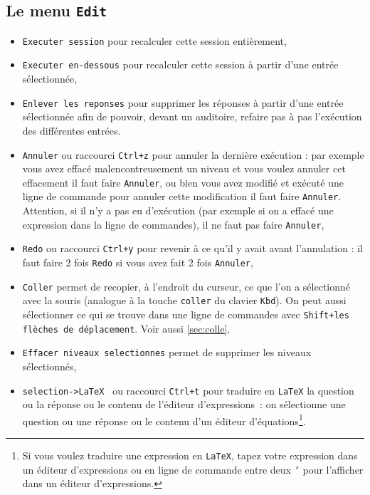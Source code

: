 \documentclass[a4paper,11pt]{article}
\begin{document}
\subsection{Le menu {\tt Edit}}
\begin{itemize}
\item
{\tt Executer session} pour recalculer cette session enti\`erement, 
\item 
{\tt Executer en-dessous} pour recalculer cette session \`a partir d'une 
entr\'ee s\'electionn\'ee,
\item  
{\tt Enlever les reponses} pour supprimer les r\'eponses \`a 
partir d'une entr\'ee s\'electionn\'ee  afin de pouvoir, devant un auditoire, 
refaire pas \`a pas l'ex\'ecution des diff\'erentes entr\'ees.
\item 
{\tt Annuler} ou raccourci {\tt Ctrl+z} pour annuler la derni\`ere 
ex\'ecution : par exemple vous avez effac\'e malencontreusement un niveau et 
vous voulez annuler cet effacement il faut faire {\tt Annuler}, ou bien vous 
avez modifi\'e et ex\'ecut\'e une ligne de commande pour annuler cette 
modification il faut faire {\tt Annuler}. 
Attention, si il n'y a pas eu d'ex\'ecution
(par exemple si on a effac\'e une expression dans la ligne de commandes),
il ne faut pas faire {\tt Annuler},
\item 
{\tt Redo} ou raccourci {\tt Ctrl+y} pour revenir \`a ce qu'il y avait 
avant l'annulation : il faut faire 2 fois {\tt Redo} si vous avez fait  2 fois 
{\tt Annuler},
\item 
{\tt Coller} permet de recopier, \`a l'endroit du curseur,
ce que l'on a s\'electionn\'e avec la souris (analogue \`a la touche 
{\tt coller} du clavier {\tt Kbd}). On peut aussi s\'electionner ce 
qui se  trouve dans une ligne de commandes
avec {\tt Shift+les fl\`eches de d\'eplacement}. Voir aussi \ref{sec:colle}.
\item
{\tt Effacer niveaux selectionnes} permet de supprimer les niveaux 
s\'electionn\'es,
\item 
{\tt selection->LaTeX } ou raccourci {\tt Ctrl+t}
pour traduire en {\tt LaTeX} la question ou la r\'eponse ou le contenu de 
l'\'editeur d'expressions~: on 
s\'electionne une question ou une r\'eponse ou le contenu d'un \'editeur 
d'\'equations\footnote{Si vous voulez traduire une expression en {\tt LaTeX}, 
tapez votre expression dans un \'editeur d'expressions ou
en ligne de commande entre deux {\tt '} pour l'afficher
dans un \'editeur d'expressions.}.


\end{itemize}
\end{document}
